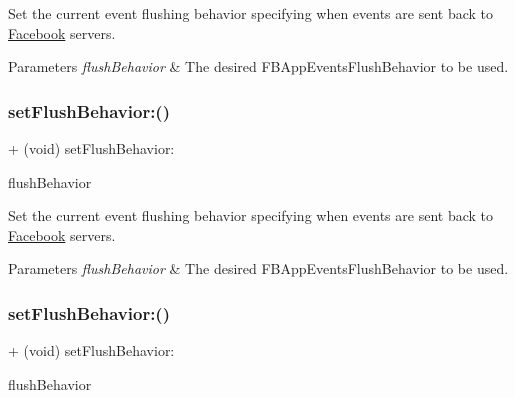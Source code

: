 Set the current event flushing behavior specifying when events are sent back to \hyperlink{interfaceFacebook}{Facebook} servers.


\begin{DoxyParams}{Parameters}
{\em flush\+Behavior} & The desired {\ttfamily F\+B\+App\+Events\+Flush\+Behavior} to be used. \\
\hline
\end{DoxyParams}
\mbox{\label{interfaceFBAppEvents_a0c6f0d165c7fba6eab71ff3228e9b848}} 
\subsubsection{\texorpdfstring{set\+Flush\+Behavior\+:()}{setFlushBehavior:()}\hspace{0.1cm}{\footnotesize\ttfamily [2/5]}}
{\footnotesize\ttfamily + (void) set\+Flush\+Behavior\+: \begin{DoxyParamCaption}\item[{(F\+B\+App\+Events\+Flush\+Behavior)}]{flush\+Behavior }\end{DoxyParamCaption}}

Set the current event flushing behavior specifying when events are sent back to \hyperlink{interfaceFacebook}{Facebook} servers.


\begin{DoxyParams}{Parameters}
{\em flush\+Behavior} & The desired {\ttfamily F\+B\+App\+Events\+Flush\+Behavior} to be used. \\
\hline
\end{DoxyParams}
\mbox{\label{interfaceFBAppEvents_a0c6f0d165c7fba6eab71ff3228e9b848}} 
\subsubsection{\texorpdfstring{set\+Flush\+Behavior\+:()}{setFlushBehavior:()}\hspace{0.1cm}{\footnotesize\ttfamily [3/5]}}
{\footnotesize\ttfamily + (void) set\+Flush\+Behavior\+: \begin{DoxyParamCaption}\item[{(F\+B\+App\+Events\+Flush\+Behavior)}]{flush\+Behavior }\end{DoxyParamCaption}}

